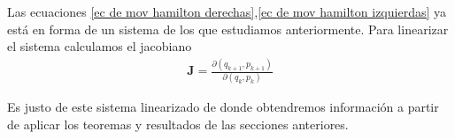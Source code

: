 Las ecuaciones \ref{ec de mov hamilton derechas},\ref{ec de mov hamilton izquierdas} ya está en forma de un sistema de los que estudiamos anteriormente. Para linearizar el sistema calculamos el jacobiano
\begin{eqnarray}
\mathbf{J}=\frac{\partial(q_{k+1},p_{k+1})}{\partial(q_{k},p_{k})}
\end{eqnarray}

Es justo de este sistema linearizado de donde obtendremos información a partir de aplicar los teoremas y resultados de las secciones anteriores. 









